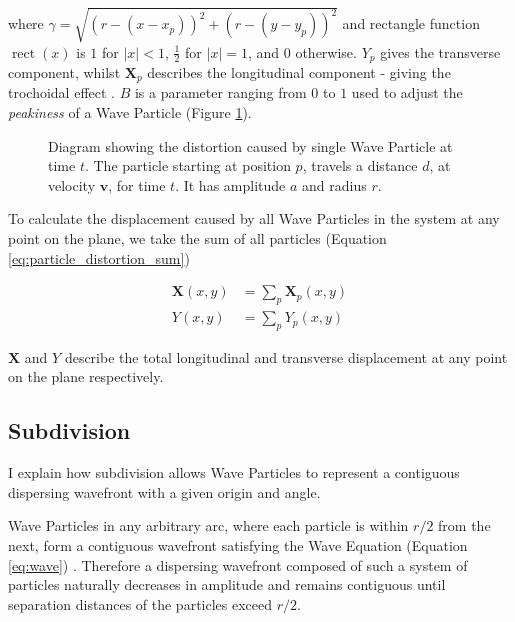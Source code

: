 \documentclass[12pt,a4paper,twoside]{report}
\DeclareMathOperator{\rect}{rect}
\begin{document}
where $\gamma=\sqrt{(r-(x-x_p))^2+(r-(y-y_p))^2}$ and rectangle function
$\rect(x)$ is $1$ for $|x| < 1$, $\frac{1}{2}$ for $|x|=1$, and $0$ otherwise.
$Y_p$ gives the transverse component, whilst $\bm{X}_p$ describes the
longitudinal component - giving the trochoidal effect
\cite{Tatarchuk:2016:ARR:2897826.2940291}. $B$ is a parameter ranging from $0$
to $1$ used to adjust the \textit{peakiness} of a Wave Particle (Figure
\ref{fig:distortion_diagram}).

\begin{figure}[h]
\def\svgwidth{\linewidth}

\caption{Diagram showing the distortion caused by single Wave Particle at time
$t$. The particle starting at position $p$, travels a distance $d$, at
velocity $\bm{v}$, for time $t$. It has amplitude $a$ and radius $r$.}
\label{fig:distortion_diagram}
\end{figure}

To calculate the displacement caused by all Wave Particles in the system at any
point on the plane, we take the sum of all particles (Equation
\ref{eq:particle_distortion_sum})

\begin{equation} \label{eq:particle_distortion_sum}
\begin{split}
\bm{X}(x,y) & =\sum_{p}\bm{X}_p(x,y) \\
Y(x,y) & =\sum_{p}Y_p(x,y)
\end{split}
\end{equation}

$\bm{X}$ and $Y$ describe the total longitudinal and transverse displacement at
any point on the plane respectively.

\subsection{Subdivision}

\label{sec:subdivision}

I explain how subdivision allows Wave Particles to represent a contiguous
dispersing wavefront with a given origin and angle.

Wave Particles in any arbitrary arc, where each particle is within $r/2$ from
the next, form a contiguous wavefront satisfying the Wave Equation (Equation
\ref{eq:wave}) \cite{Yuksel2007}. Therefore a dispersing wavefront composed of
such a system of particles naturally decreases in amplitude and remains
contiguous until separation distances of the particles exceed $r/2$.
\end{document}
